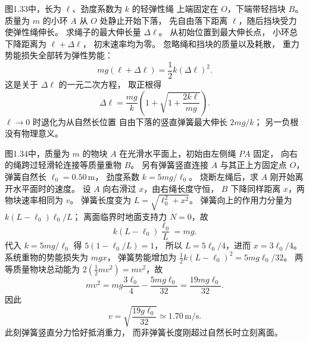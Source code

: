 图1.33中，长为 $\ell$、劲度系数为 $k$ 的轻弹性绳
上端固定在 $O$，下端带轻挡块 $B$。
质量为 $m$ 的小环 $A$ 从 $O$ 处静止开始下落，
先自由落下距离 $\ell$，随后挡块受力使弹性绳伸长。
求绳子的最大伸长量 $\Delta\ell$。
\exsolution
从初始位置到最大伸长点，
小环总下降距离为 $\ell+\Delta\ell$，
初末速率均为零。
忽略绳和挡块的质量以及耗散，
重力势能损失全部转为弹性势能：
\[
mg(\ell+\Delta\ell)=\frac12 k(\Delta\ell)^2.
\]
这是关于 $\Delta\ell$ 的一元二次方程，
取正根得
\[
\boxed{\Delta\ell=
\frac{mg}{k}\left(1+
\sqrt{1+\frac{2k\ell}{mg}}\right)}.
\]
\excheck $\ell\to0$ 时退化为从自然长位置
自由下落的竖直弹簧最大伸长 $2mg/k$；
另一负根没有物理意义。

图1.34中，质量为 $m$ 的物块 $A$
在光滑水平面上，初始由左侧绳 $PA$ 固定，
向右的绳跨过轻滑轮连接等质量重物 $B$。
另有弹簧竖直连接 $A$ 与其正上方固定点 $O$，
弹簧自然长 $\ell_0=0.50\,\mathrm m$，
劲度系数 $k=5mg/\ell_0$。
烧断左绳后，求 $A$ 刚开始离开水平面时的速度。
\exsolution
设 $A$ 向右滑过 $x$，由右绳长度守恒，
$B$ 下降同样距离 $x$，两物块速率相同为 $v$。
弹簧长度变为
$L=\sqrt{\ell_0^2+x^2}$。
弹簧向上的作用力分量为
$k(L-\ell_0)\ell_0/L$；
离面临界时地面支持力 $N=0$，故
\[
k(L-\ell_0)\frac{\ell_0}{L}=mg.
\]
代入 $k=5mg/\ell_0$ 得
$5(1-\ell_0/L)=1$，
所以 $L=5\ell_0/4$，进而
$x=3\ell_0/4$。
系统重物的势能损失为 $mgx$，
弹簧势能增加为
$\tfrac12 k(L-\ell_0)^2=5mg\ell_0/32$。
两等质量物块总动能为
$2(\tfrac12 mv^2)=mv^2$，故
\[
mv^2=mg\frac{3\ell_0}{4}
-\frac{5mg\ell_0}{32}
=\frac{19mg\ell_0}{32}.
\]
因此
\[
\boxed{v=\sqrt{\frac{19g\ell_0}{32}}
\simeq1.70\,\mathrm{m/s}}.
\]
\excheck 此刻弹簧竖直分力恰好抵消重力，
而非弹簧长度刚超过自然长时立刻离面。
